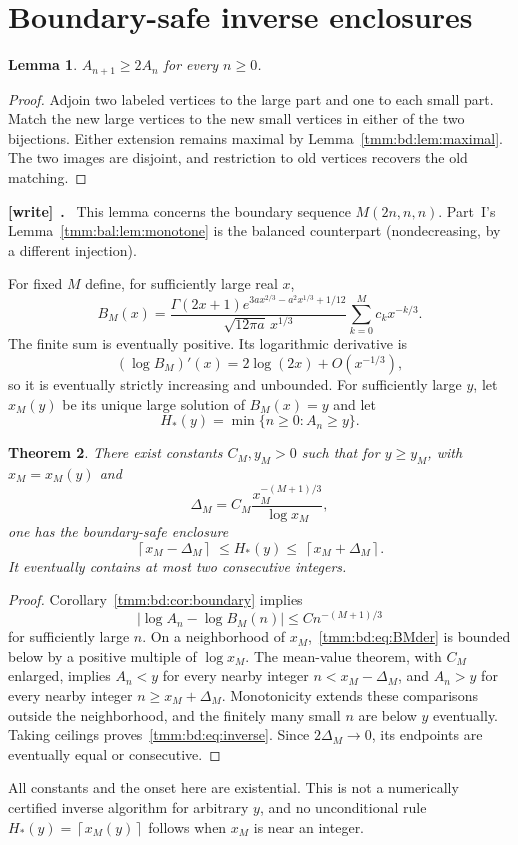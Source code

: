 \documentclass[11pt,letterpaper]{article}
\newtheorem{theorem}{Theorem}[section]
\newtheorem{lemma}[theorem]{Lemma}
\theoremstyle{remark}\newtheorem{remark}[theorem]{Remark}
\newcommand{\ceil}[1]{\left\lceil #1\right\rceil}
\newenvironment{writenote}[1][]{\par\smallskip\begingroup\small
 \noindent\textbf{[write]}\if\relax\detokenize{#1}\relax\else~\textbf{#1.}\fi\ }%
 {\par\endgroup\smallskip}
\begin{document}
\section{Boundary-safe inverse enclosures}\label{tmm:bd:sec:inverse}
\begin{lemma}\label{tmm:bd:lem:monotone}
$A_{n+1}\ge2A_n$ for every $n\ge0$.
\end{lemma}
\begin{proof}
Adjoin two labeled vertices to the large part and one to each small part. Match the new large vertices to the new small vertices in either of the two bijections. Either extension remains maximal by Lemma~\ref{tmm:bd:lem:maximal}. The two images are disjoint, and restriction to old vertices recovers the old matching.
\end{proof}
\begin{writenote}
This lemma concerns the boundary sequence $M(2n,n,n)$. Part~I's Lemma~\ref{tmm:bal:lem:monotone} is the balanced counterpart (nondecreasing, by a different injection).
\end{writenote}
For fixed $M$ define, for sufficiently large real $x$,
\begin{equation}\label{tmm:bd:eq:BM}
 B_M(x)=\frac{\Gamma(2x+1)e^{3ax^{2/3}-a^2x^{1/3}+1/12}}
 {\sqrt{12\pi a}\,x^{1/3}}\sum_{k=0}^Mc_kx^{-k/3}.
\end{equation}
The finite sum is eventually positive. Its logarithmic derivative is
\begin{equation}\label{tmm:bd:eq:BMder}
 (\log B_M)'(x)=2\log(2x)+O(x^{-1/3}),
\end{equation}
so it is eventually strictly increasing and unbounded. For sufficiently large $y$, let $x_M(y)$ be its unique large solution of $B_M(x)=y$ and let
\[
 H_*(y)=\min\{n\ge0:A_n\ge y\}.
\]
\begin{theorem}\label{tmm:bd:thm:inverse}
There exist constants $C_M,y_M>0$ such that for $y\ge y_M$, with $x_M=x_M(y)$ and
\[
 \Delta_M=C_M\frac{x_M^{-(M+1)/3}}{\log x_M},
\]
one has the boundary-safe enclosure
\begin{equation}\label{tmm:bd:eq:inverse}
 \ceil{x_M-\Delta_M}\ \le H_*(y)\le\ \ceil{x_M+\Delta_M}.
\end{equation}
It eventually contains at most two consecutive integers.
\end{theorem}
\begin{proof}
Corollary~\ref{tmm:bd:cor:boundary} implies
\[
 |\log A_n-\log B_M(n)|\le Cn^{-(M+1)/3}
\]
for sufficiently large $n$. On a neighborhood of $x_M$,~\eqref{tmm:bd:eq:BMder} is bounded below by a positive multiple of $\log x_M$. The mean-value theorem, with $C_M$ enlarged, implies $A_n<y$ for every nearby integer $n<x_M-\Delta_M$, and $A_n>y$ for every nearby integer $n\ge x_M+\Delta_M$. Monotonicity extends these comparisons outside the neighborhood, and the finitely many small $n$ are below $y$ eventually. Taking ceilings proves~\eqref{tmm:bd:eq:inverse}. Since $2\Delta_M\to0$, its endpoints are eventually equal or consecutive.
\end{proof}
All constants and the onset here are existential. This is not a numerically certified inverse algorithm for arbitrary $y$, and no unconditional rule $H_*(y)=\ceil{x_M(y)}$ follows when $x_M$ is near an integer.
\end{document}
